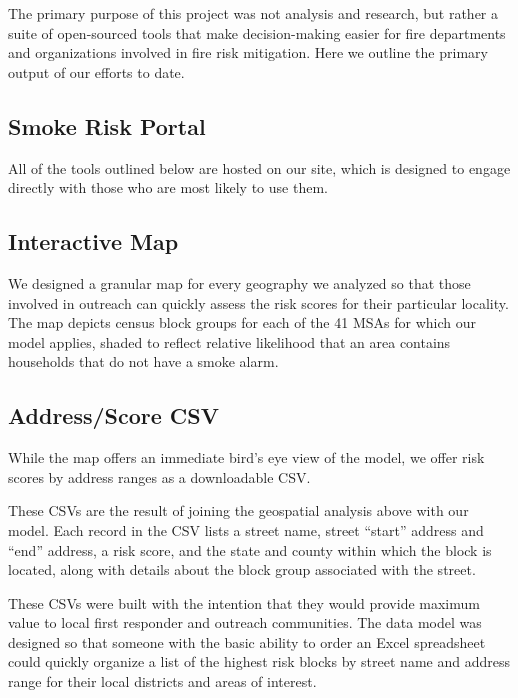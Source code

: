 \documentclass{sig-alternate}
\begin{document}
The primary purpose of this project was not analysis and research, but rather a suite of open-sourced tools that make decision-making easier for fire departments and organizations involved in fire risk mitigation. Here we outline the primary output of our efforts to date.

\subsection{Smoke Risk Portal}

All of the tools outlined below are hosted on our site, which is designed to engage directly with those who are most likely to use them. 

\subsection{Interactive Map}

We designed a granular map for every geography we analyzed so that those involved in outreach can quickly assess the risk scores for their particular locality. The map depicts census block groups for each of the 41 MSAs for which our model applies, shaded to reflect relative likelihood that an area contains households that do not have a smoke alarm.

\subsection{Address/Score CSV}

While the map offers an immediate bird's eye view of the model, we offer risk scores by address ranges as a downloadable CSV.

These CSVs are the result of joining the geospatial analysis above with our model. Each record in the CSV lists a street name, street ``start'' address and ``end'' address, a risk score, and the state and county within which the block is located, along with details about the block group associated with the street.

These CSVs were built with the intention that they would provide maximum value to local first responder and outreach communities. The data model was designed so that someone with the basic ability to order an Excel spreadsheet could quickly organize a list of the highest risk blocks by street name and address range for their local districts and areas of interest.
\end{document}

